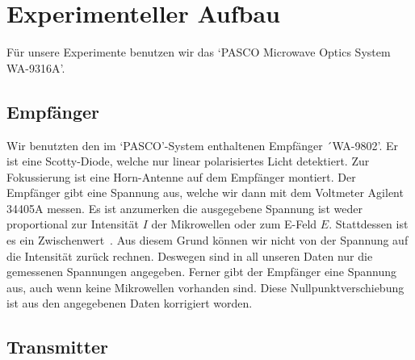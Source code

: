 \documentclass[a4paper,10pt,twocolumn]{article}
\begin{document}
    \section{Experimenteller Aufbau}
    Für unsere Experimente benutzen wir das `PASCO Microwave Optics System WA-9316A'.
    \subsection{Empfänger}
    
    Wir benutzten den im `PASCO'-System enthaltenen Empfänger ´WA-9802'.
    Er ist eine Scotty-Diode, welche nur linear polarisiertes Licht detektiert.
    Zur Fokussierung ist eine Horn-Antenne auf dem Empfänger montiert.
    Der Empfänger gibt eine Spannung aus, welche wir dann mit dem Voltmeter Agilent 34405A messen.
    Es ist anzumerken die ausgegebene Spannung ist weder proportional zur Intensität $I$ der Mikrowellen oder zum E-Feld $E$.
    Stattdessen ist es ein Zwischenwert~\cite{pasco}.
    Aus diesem Grund können wir nicht von der Spannung auf die Intensität zurück rechnen.
    Deswegen sind in all unseren Daten nur die gemessenen Spannungen angegeben.
    Ferner gibt der Empfänger eine Spannung aus, auch wenn keine Mikrowellen vorhanden sind.
    Diese Nullpunktverschiebung ist aus den angegebenen Daten korrigiert worden.
    
    \subsection{Transmitter}

    

\end{document}
